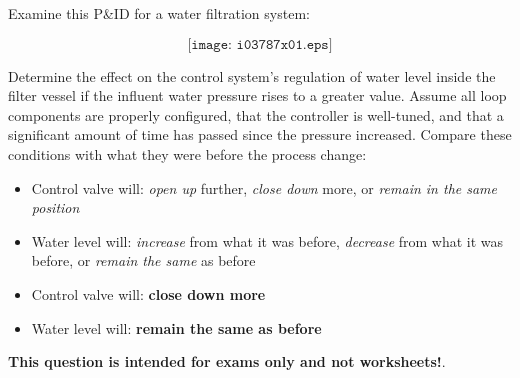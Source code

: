 

Examine this P\&ID for a water filtration system:

$$\texttt{[image: i03787x01.eps]}$$

Determine the effect on the control system's regulation of water level inside the filter vessel if the influent water pressure rises to a greater value.  Assume all loop components are properly configured, that the controller is well-tuned, and that a significant amount of time has passed since the pressure increased.  Compare these conditions with what they were before the process change:

\begin{itemize}
\item{} Control valve will: {\it open up} further, {\it close down} more, or {\it remain in the same position} 
\vskip 10pt
\item{} Water level will: {\it increase} from what it was before, {\it decrease} from what it was before, or {\it remain the same} as before
\end{itemize}







\begin{itemize}
\item{} Control valve will: {\bf close down more}
\vskip 5pt
\item{} Water level will: {\bf remain the same as before} 
\end{itemize}







{\bf This question is intended for exams only and not worksheets!}.



